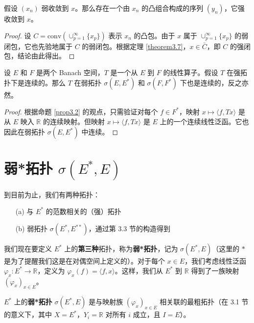 \begin{corollary}[Mazur]\label{corollary3.8}
假设 $(x_n)$ 弱收敛到 $x$。那么存在一个由 $x_n$ 的凸组合构成的序列 $(y_n)$，它强收敛到 $x$。
\end{corollary}

\begin{proof}
设 $C = \text{conv}(\cup_{p=1}^\infty \{x_p\})$ 表示 $x_n$ 的凸包。由于 $x$ 属于 $\cup_{p=1}^\infty \{x_p\}$ 的弱闭包，它也先验地属于 $C$ 的弱闭包。根据定理 \ref{theorem3.7}，$x \in \bar{C}$，即 $C$ 的强闭包，结论由此得出。
\end{proof}

\begin{theorem}\label{theorem3.10}
设 $E$ 和 $F$ 是两个 Banach 空间，$T$ 是一个从 $E$ 到 $F$ 的线性算子。假设 $T$ 在强拓扑下是连续的。那么 $T$ 在弱拓扑 $\sigma(E, E^*)$ 和 $\sigma(F, F^*)$ 下也是连续的，反之亦然。
\end{theorem}

\begin{proof}
根据命题 \ref{prop3.2} 的观点，只需验证对每个 $f \in F^*$，映射 $x \mapsto \langle f, Tx \rangle$ 是从 $E$ 映入 $\mathbb{R}$ 的连续映射。但映射 $x \mapsto \langle f, Tx \rangle$ 是 $E$ 上的一个连续线性泛函。它也因此在弱拓扑 $\sigma(E, E^*)$ 中连续。
\end{proof}

\section{弱*拓扑 $\sigma(E^*, E)$}

到目前为止，我们有两种拓扑：
\begin{itemize}
    \item[(a)] 与 $E^*$ 的范数相关的（强）拓扑
    \item[(b)] 弱拓扑 $\sigma(E^*, E^{**})$，通过第 3.3 节的构造得到
\end{itemize}

我们现在要定义 $E^*$ 上的\textbf{第三种}拓扑，称为\textbf{弱*拓扑}，记为 $\sigma(E^*, E)$（这里的 $*$ 是为了提醒我们这是在对偶空间上定义的）。对于每个 $x \in E$，我们考虑线性泛函 $\varphi_x: E^* \to \mathbb{R}$，定义为 $\varphi_x(f) = \langle f, x \rangle$。这样，我们从 $E^*$ 到 $\mathbb{R}$ 得到了一族映射 $(\varphi_x)_{x \in E}$。

\begin{definition}\label{def_weak_star_topology}
$E^*$ 上的\textbf{弱*拓扑} $\sigma(E^*, E)$ 是与映射族 $(\varphi_x)_{x \in E}$ 相关联的最粗拓扑（在 3.1 节的意义下，其中 $X = E^*$，$Y_i = \mathbb{R}$ 对所有 $i$ 成立，且 $I = E$）。
\end{definition}

